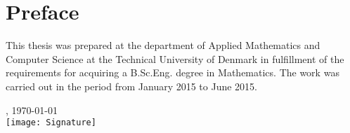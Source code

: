 \chapter{Preface}
This thesis was prepared at the department of Applied Mathematics and Computer Science at the Technical University of Denmark in fulfillment of the requirements for acquiring a B.Sc.Eng. degree in Mathematics. The work was carried out in the period from January 2015 to June 2015.

\vfill

{
\centering
    \thesislocation{}, \today\\[1cm]
    \hspace{3cm}\texttt{[image: Signature]}\\[1cm]
\begin{flushright}
    \thesisauthor{}
\end{flushright}
}